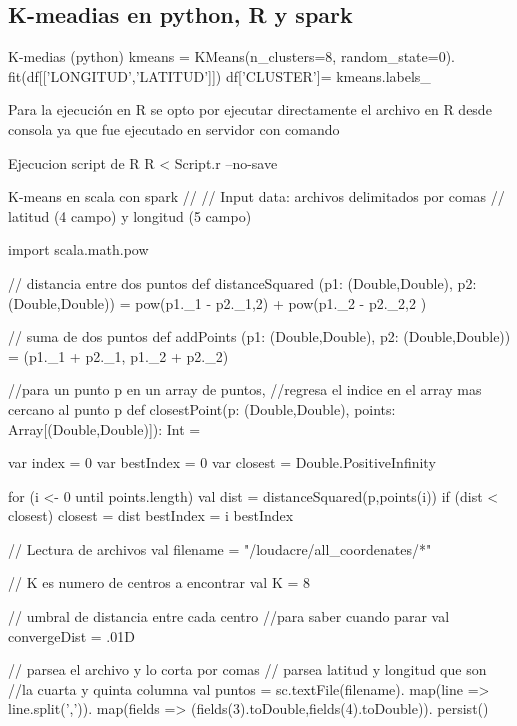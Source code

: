 \documentclass[a4paper]{article}
\begin{document}
\subsection{K-meadias en python, R y spark}
\begin{sexylisting}{K-medias (python)}
kmeans = 
KMeans(n_clusters=8, random_state=0).
fit(df[['LONGITUD','LATITUD']])
df['CLUSTER']= kmeans.labels_
\end{sexylisting}
Para la ejecuci\'on en R se opto por ejecutar directamente el archivo en R desde consola ya que fue ejecutado en servidor con comando

\begin{sexylisting}{Ejecucion script de R}
R < Script.r --no-save
\end{sexylisting}



\begin{sexylisting}{K-means en scala con spark}
// 
// Input data: archivos delimitados por comas
// latitud (4 campo) y longitud (5 campo)


import scala.math.pow

// distancia entre dos puntos
def distanceSquared
(p1: (Double,Double), p2: (Double,Double)) = { 
  pow(p1._1 - p2._1,2) + pow(p1._2 - p2._2,2 )
}

// suma de dos puntos
def addPoints
(p1: (Double,Double), p2: (Double,Double)) = {
  (p1._1 + p2._1, p1._2 + p2._2)
}


//para un punto p en un array de puntos, 
//regresa el indice en el array mas cercano al punto p
def closestPoint(p: (Double,Double), points: 
Array[(Double,Double)]): Int = {
    var index = 0
    var bestIndex = 0
    var closest = Double.PositiveInfinity

    for (i <- 0 until points.length) {
      val dist = distanceSquared(p,points(i))
      if (dist < closest) {
        closest = dist
        bestIndex = i
      }
    }
    bestIndex
}

// Lectura de archivos
val filename = "/loudacre/all_coordenates/*"

// K es numero de centros a encontrar
val K = 8

// umbral de distancia entre cada centro 
//para saber cuando parar
val convergeDist = .01D
    
// parsea el archivo y lo corta por comas
// parsea latitud y longitud que son
//la cuarta y quinta columna
val puntos = sc.textFile(filename).
     map(line => line.split(',')).
     map(fields => 
     (fields(3).toDouble,fields(4).toDouble)).
     persist()


\end{sexylisting}
\end{document}
